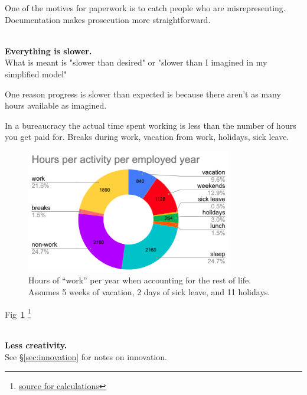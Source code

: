 One of the motives for paperwork is to catch people who are misrepresenting. Documentation makes prosecution more straightforward.

\ \\

\textbf{Everything is slower.}\\
What is meant is "slower than desired" or "slower than I imagined in my simplified model"

One reason progress is slower than expected is because there aren't as many hours available as imagined.



In a bureaucracy the actual time spent working is less than the number of hours you get paid for. Breaks during work, vacation from work, holidays, sick leave. 


\begin{figure}[H]
    \centering
    \includegraphics[width=0.8\textwidth]{images/hours_per_activity_per_employed_year}
    \caption{Hours of ``work'' per year when accounting for the rest of life. Assumes 5 weeks of vacation, 2 days of sick leave, and 11 holidays.}
    \label{fig:hours_per_year}
\end{figure}

Fig~\ref{fig:hours_per_year}
\footnote{\href{https://docs.google.com/spreadsheets/d/1ZaOZZXWkEzX4fFltUdlR4A6ENrAXnkzTW4YrjA4tDO8/edit?usp=sharing}{source for calculations}}

\ \\

\textbf{Less creativity.}\\
See \S\ref{sec:innovation} for notes on innovation.

